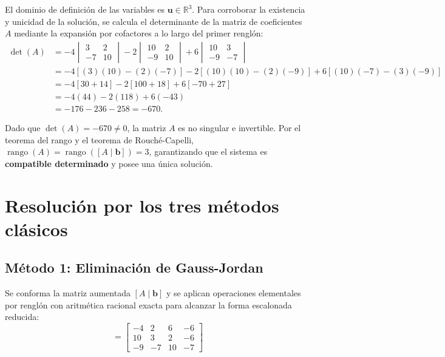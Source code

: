 \documentclass[spanish,letterpaper,oneside]{article}
\begin{document}
El dominio de definición de las variables es $\mathbf{u} \in \mathbb{R}^3$. Para corroborar la existencia y unicidad de la solución, se calcula el determinante de la matriz de coeficientes $A$ mediante la expansión por cofactores a lo largo del primer renglón:
\begin{align*}
\det(A) &= -4 \begin{vmatrix} 3 & 2 \\ -7 & 10 \end{vmatrix} - 2 \begin{vmatrix} 10 & 2 \\ -9 & 10 \end{vmatrix} + 6 \begin{vmatrix} 10 & 3 \\ -9 & -7 \end{vmatrix} \\
&= -4 [(3)(10) - (2)(-7)] - 2 [(10)(10) - (2)(-9)] + 6 [(10)(-7) - (3)(-9)] \\
&= -4 [30 + 14] - 2 [100 + 18] + 6 [-70 + 27] \\
&= -4(44) - 2(118) + 6(-43) \\
&= -176 - 236 - 258 = -670.
\end{align*}

Dado que $\det(A) = -670 \neq 0$, la matriz $A$ es no singular e invertible. Por el teorema del rango y el teorema de Rouché-Capelli, $\operatorname{rango}(A) = \operatorname{rango}([A \mid \mathbf{b}]) = 3$, garantizando que el sistema es \textbf{compatible determinado} y posee una única solución.

\section{Resolución por los tres métodos clásicos}

\subsection{Método 1: Eliminación de Gauss-Jordan}
Se conforma la matriz aumentada $[A \mid \mathbf{b}]$ y se aplican operaciones elementales por renglón con aritmética racional exacta para alcanzar la forma escalonada reducida:
\begin{equation*}
[A \mid \mathbf{b}] = \left[\begin{array}{rrr|r}
-4 & 2 & 6 & -6 \\
10 & 3 & 2 & -6 \\
-9 & -7 & 10 & -7
\end{array}\right]
\end{equation*}
\end{document}
